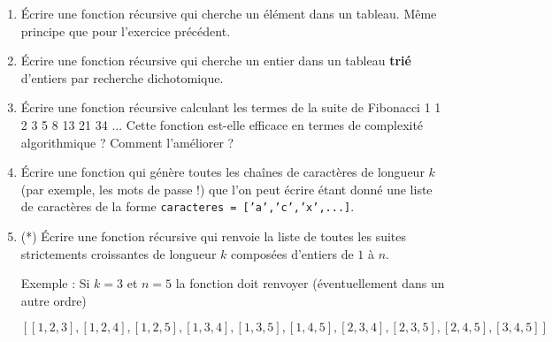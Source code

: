 \documentclass[11pt,a4paper]{article}
\newcommand{\checkbox}{$\square$ \smallskip}
\newcounter{exo} \setcounter{exo}{0}
\newenvironment{action}{%
    \begin{enumerate}[\numerotation] \addtocounter{exo}{-1}%
        }{%
    \end{enumerate}
}
\newcommand{\numexoa}{\theexo \addtocounter{exo}{1}}
\newcommand{\numerotation}{\checkbox \smallskip \numexoa.}
\begin{document}
\begin{action}
\item
\'Ecrire une fonction récursive qui cherche un élément dans un tableau. Même
principe que pour l'exercice précédent.\\

\item
\'Ecrire une fonction récursive qui cherche un entier dans un tableau {\bf trié} d'entiers
par recherche dichotomique.\\


\item
\'Ecrire une fonction récursive calculant les termes de la suite de Fibonacci 1 1 2 3 5 8 13 21 34 ... Cette fonction est-elle efficace en termes de complexité algorithmique ? Comment l'améliorer ?

\item \'Ecrire une fonction qui génère toutes les chaînes de caractères
de longueur $k$ (par exemple, les mots de passe !) que l'on peut
écrire étant donné une liste de
caractères de la forme {\tt caracteres = ['a','c','x',...]}.

\item (*) \'Ecrire une fonction récursive qui renvoie la liste de toutes les suites
  strictements
  croissantes de longueur $k$ composées d'entiers de $1$ à $n$.

  Exemple : Si $k=3$ et $n=5$ la fonction doit renvoyer (éventuellement dans un
  autre ordre)
  
\[ [[1,2,3], [1,2,4], [1,2,5], [1,3,4], [1,3,5], [1,4,5], [2,3,4], [2,3,5],
  [2,4,5], [3,4,5] ] \]

\end{action}
\end{document}
